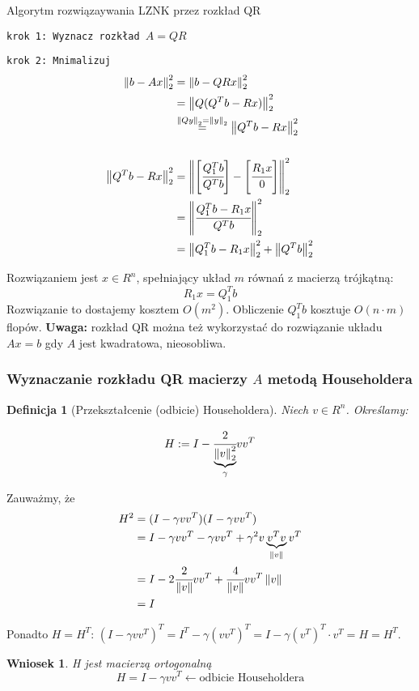 \documentclass[hidelinks,a4paper,fleqn,oneside]{book}
\newcommand{\la}{\leftarrow}
\newcommand{\norm}[1]{\left\lVert#1\right\rVert}
\newtheorem{wniosek}{Wniosek}
\newtheorem{defi}{Definicja}
\begin{document}
Algorytm rozwiązaywania LZNK przez rozkład QR


\texttt{krok 1: Wyznacz rozkład $A = QR$}

\texttt{krok 2: Mnimalizuj }\begin{align*}
\norm{b - Ax}_2^2 &= \norm{b - QRx}^2_2 \\
& = \norm{Q(Q^Tb - Rx)}_2^2 \\
& \stackrel{\norm{Q y}_2 = \norm{y}_2}{=} \norm{Q^Tb - Rx}_2^2 \\
\\
 \norm{Q^Tb - Rx}_2^2 & = \norm{\left[\cfrac{Q_1^Tb}{Q^Tb}\right] - \left[\cfrac{R_1x}{0}\right]}_2^2 \\
 & = \norm{\cfrac{Q_1^Tb - R_1x}{Q^T b}}_2^2 \\
 & = \norm{Q_1^Tb - R_1x}_2^2 + \norm{Q^T b}_2^2
\end{align*}

Rozwiązaniem jest $x \in R^n$, spełniający układ $m$ równań z macierzą trójkątną:
\[
	R_1x = Q_1^Tb
\]
Rozwiązanie to dostajemy kosztem $O(m^2)$. Obliczenie $Q_1^Tb$ kosztuje $O(n \cdot m)$ flopów. \textbf{Uwaga: }rozkład QR można też wykorzystać do rozwiązanie układu $Ax=b$ gdy $A$ jest kwadratowa, nieosobliwa.

\subsubsection{Wyznaczanie rozkładu QR macierzy $A$ metodą Householdera}

\begin{defi}[Przekształcenie (odbicie) Householdera] 
Niech $v \in R^n$. Określamy:
	
	\[
		H := I - \cfrac{2}{\underbrace{\norm{v}_2^2}_{\gamma}}vv^T
	\]
\end{defi}

Zauważmy, że 
\begin{align*}
H^2 & = (I - \gamma vv^T)(I - \gamma vv^T) \\
& = I - \gamma vv^T - \gamma vv^T + \gamma^2v\underbrace{v^Tv}_{\norm{v}}v^T \\
& = I - 2 \cfrac{2}{\norm{v}}v v^T + \cfrac{4}{\norm{v}}  vv^T \norm{v} \\
& = I
\end{align*}

Ponadto $H = H^T$: $(I - \gamma vv^T)^T = I^T - \gamma(vv^T)^T = I - \gamma(v^T)^T \cdot v^T = H = H^T$.

\begin{wniosek}H jest macierzą ortogonalną
	\[
		H = I - \gamma vv^T \la \textrm{odbicie Householdera}
	\]
\end{wniosek}
\end{document}
